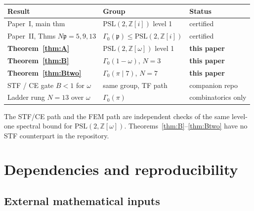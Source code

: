 \documentclass[11pt]{amsart}
\newcommand{\ZZ}{\mathbb{Z}}
\newcommand{\PSL}{\mathrm{PSL}}
\newcommand{\p}{\mathfrak{p}}
\begin{document}
\begin{center}
\begin{tabular}{@{}lll@{}}
\toprule
Result & Group & Status \\
\midrule
Paper~I, main thm
  & $\PSL(2,\ZZ[i])$ level 1 & certified \\
Paper~II, Thms $N\p=5,9,13$
  & $\Gamma_0(\p)\le\PSL(2,\ZZ[i])$ & certified \\
\textbf{Theorem~\ref{thm:A}}
  & $\PSL(2,\ZZ[\omega])$ level 1 & \textbf{this paper} \\
\textbf{Theorem~\ref{thm:B}}
  & $\Gamma_0(1-\omega)$, $N=3$ & \textbf{this paper} \\
\textbf{Theorem~\ref{thm:Btwo}}
  & $\Gamma_0(\pi\mid 7)$, $N=7$ & \textbf{this paper} \\
STF / CE gate $B<1$ for $\omega$
  & same group, TF path & companion repo \\
Ladder rung $N=13$ over $\omega$
  & $\Gamma_0(\pi)$ & combinatorics only \\
\bottomrule
\end{tabular}
\end{center}

The STF/CE path and the FEM path are independent checks of the same
level-one spectral bound for $\PSL(2,\ZZ[\omega])$.
Theorems~\ref{thm:B}--\ref{thm:Btwo} have no STF counterpart in the
repository.

\section{Dependencies and reproducibility}\label{sec:deps}

\subsection{External mathematical inputs}
\end{document}
